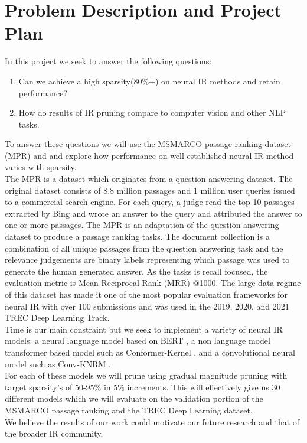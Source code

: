 \documentclass[sigplan,screen]{acmart}
\begin{document}
\section{Problem Description and Project Plan}
In this project we seek to answer the following questions: 
\begin{enumerate}
    \item Can we achieve a high sparsity(80\%+) on neural IR methods and retain performance?
    \item How do results of IR pruning compare to computer vision and other NLP tasks.
\end{enumerate}
To answer these questions we will use the MSMARCO passage ranking dataset (MPR) \cite{Campos2016MSMA} and and explore how performance on well established neural IR method varies with sparsity. \\
The MPR is a dataset which originates from a question answering dataset. The original dataset consists of 8.8 million passages and 1 million user queries issued to a commercial search engine. For each query, a judge read the top 10 passages extracted by Bing and wrote an answer to the query and attributed the answer to one or more passages. The MPR is an adaptation of the question answering dataset to produce a passage ranking tasks. The document collection is a combination of all unique passages from the question answering task and the relevance judgements are binary labels representing which passage was used to generate the human generated answer. As the tasks is recall focused, the evaluation metric is Mean Reciprocal Rank (MRR) @1000. The large data regime of this dataset has made it one of the most popular evaluation frameworks for neural IR with over 100 submissions and was used in the 2019, 2020, and 2021 TREC Deep Learning Track. \\
Time is our main constraint but we seek to implement a variety of neural IR models: a neural language model based on BERT \cite{Devlin2019BERTPO}, a non language model transformer based model such as Conformer-Kernel \cite{Mitra2020ConformerKernelWQ}, and a convolutional neural model such as Conv-KNRM \cite{10.1145/3159652.3159659}.\\
For each of these models we will prune using gradual magnitude pruning with target sparsity's of 50-95\% in 5\% increments. This will effectively give us 30 different models which we will evaluate on the validation portion of the MSMARCO passage ranking and the TREC Deep Learning dataset. \\
We believe the results of our work could motivate our future research and that of the broader IR community. 
\end{document}
